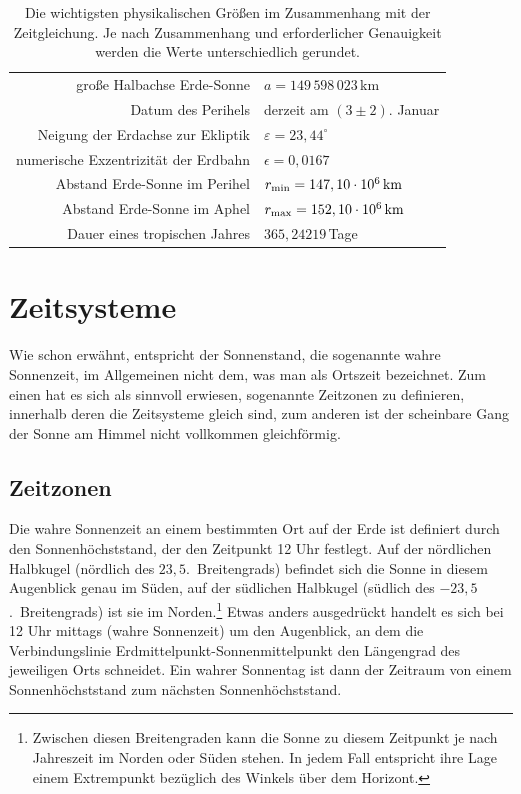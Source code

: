 \begin{table}[htb]
\begin{tabular}{r|l}
gro\ss e Halbachse Erde-Sonne &  $a = 149\,598\,023$\,km   \\
Datum des Perihels &  derzeit am $(3\pm 2)$. Januar \\
Neigung der Erdachse zur Ekliptik&   $\varepsilon = 23,44^\circ $  \\
numerische Exzentrizit\"at der Erdbahn & $\epsilon = 0,0167$ \\
Abstand Erde-Sonne im Perihel & $r_{\rm min} = 147,10 \cdot 10^6\,{\rm km}$ \\  
Abstand Erde-Sonne im Aphel & $r_{\rm max} = 152,10 \cdot 10^6\,{\rm km}$ \\  
Dauer eines tropischen Jahres & $365,24219$\,Tage \\ 
\end{tabular}
\caption{\label{tab_Zeit}%
Die wichtigsten physikalischen Gr\"o\ss en im Zusammenhang mit der
Zeitgleichung. Je nach Zusammenhang und erforderlicher Genauigkeit werden die Werte 
unterschiedlich gerundet.}
\end{table}


\section{Zeitsysteme}

Wie schon erw\"ahnt, entspricht der Sonnenstand, die sogenannte wahre
Sonnenzeit, im Allgemeinen nicht dem, was man als Ortszeit bezeichnet. 
Zum einen hat es sich als sinnvoll erwiesen, sogenannte Zeitzonen zu definieren,
innerhalb deren die Zeitsysteme gleich sind, zum anderen ist der scheinbare Gang der Sonne
am Himmel nicht vollkommen gleichf\"ormig. 

\subsection{Zeitzonen}

Die wahre Sonnenzeit an einem bestimmten Ort auf der Erde ist definiert durch
den Sonnenh\"ochststand, der den Zeitpunkt 12 Uhr festlegt. Auf der
n\"ordlichen Halbkugel (n\"ordlich des $23,5$.\ Breitengrads) befindet sich die
Sonne in diesem Augenblick genau im S\"uden, auf der s\"udlichen Halbkugel (s\"udlich
des $-23,5$.\ Breitengrads) ist sie im Norden.\footnote{Zwischen diesen Breitengraden
kann die Sonne zu diesem Zeitpunkt je nach Jahreszeit im Norden oder S\"uden 
stehen. In jedem Fall entspricht ihre Lage einem Extrempunkt bez\"uglich des
Winkels \"uber dem Horizont.}  
Etwas anders ausgedr\"uckt handelt es sich bei 12 Uhr mittags (wahre Sonnenzeit) um
den Augenblick, an dem die Verbindungslinie Erdmittelpunkt-Sonnenmittelpunkt den
L\"angengrad des jeweiligen Orts schneidet. Ein wahrer Sonnentag ist dann der
Zeitraum von einem Sonnenh\"ochststand zum n\"achsten Sonnenh\"ochststand.

